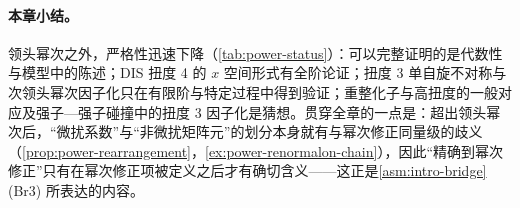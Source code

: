 \paragraph{本章小结。}
领头幂次之外，严格性迅速下降（\cref{tab:power-status}）：可以完整证明的是代数性与模型中的陈述；DIS 扭度 4 的 $x$ 空间形式有全阶论证；扭度 3 单自旋不对称与次领头幂次因子化只在有限阶与特定过程中得到验证；重整化子与高扭度的一般对应及强子—强子碰撞中的扭度 3 因子化是猜想。贯穿全章的一点是：超出领头幂次后，“微扰系数”与“非微扰矩阵元”的划分本身就有与幂次修正同量级的歧义（\cref{prop:power-rearrangement}，\cref{ex:power-renormalon-chain}），因此“精确到幂次修正”只有在幂次修正项被定义之后才有确切含义——这正是\cref{asm:intro-bridge}(Br3) 所表达的内容。
